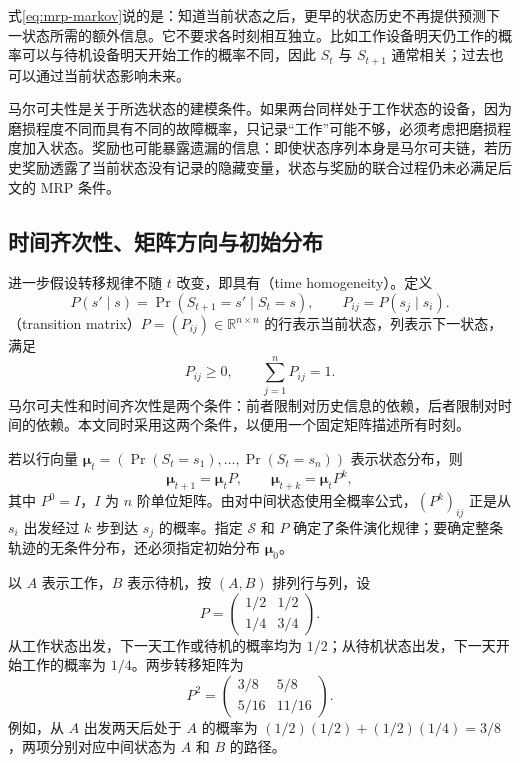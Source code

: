 \documentclass[UTF8]{ctexart}
\begin{document}
式\eqref{eq:mrp-markov}说的是：知道当前状态之后，更早的状态历史不再提供预测下一状态所需的额外信息。它不要求各时刻相互独立。比如工作设备明天仍工作的概率可以与待机设备明天开始工作的概率不同，因此 $S_t$ 与 $S_{t+1}$ 通常相关；过去也可以通过当前状态影响未来。

马尔可夫性是关于所选状态的建模条件。如果两台同样处于工作状态的设备，因为磨损程度不同而具有不同的故障概率，只记录“工作”可能不够，必须考虑把磨损程度加入状态。奖励也可能暴露遗漏的信息：即使状态序列本身是马尔可夫链，若历史奖励透露了当前状态没有记录的隐藏变量，状态与奖励的联合过程仍未必满足后文的 MRP 条件。

\subsection{时间齐次性、矩阵方向与初始分布}

进一步假设转移规律不随 $t$ 改变，即具有（time homogeneity）。定义
\begin{equation}
  P(s'\mid s)=\Pr(S_{t+1}=s'\mid S_t=s),\qquad
  P_{ij}=P(s_j\mid s_i).
  \label{eq:mrp-transition}
\end{equation}
（transition matrix）$P=(P_{ij})\in\mathbb R^{n\times n}$ 的行表示当前状态，列表示下一状态，满足
\[
  P_{ij}\geq0,\qquad \sum_{j=1}^{n}P_{ij}=1.
\]
马尔可夫性和时间齐次性是两个条件：前者限制对历史信息的依赖，后者限制对时间的依赖。本文同时采用这两个条件，以便用一个固定矩阵描述所有时刻。

若以行向量 $\boldsymbol\mu_t=(\Pr(S_t=s_1),\ldots,\Pr(S_t=s_n))$ 表示状态分布，则
\begin{equation}
  \boldsymbol\mu_{t+1}=\boldsymbol\mu_tP,\qquad
  \boldsymbol\mu_{t+k}=\boldsymbol\mu_tP^k,
  \label{eq:mrp-distribution}
\end{equation}
其中 $P^0=I$，$I$ 为 $n$ 阶单位矩阵。由对中间状态使用全概率公式，$(P^k)_{ij}$ 正是从 $s_i$ 出发经过 $k$ 步到达 $s_j$ 的概率。指定 $\mathcal S$ 和 $P$ 确定了条件演化规律；要确定整条轨迹的无条件分布，还必须指定初始分布 $\boldsymbol\mu_0$。

\begin{example}[贯穿全文的两状态模型]
\label{ex:mrp-model}
以 $A$ 表示工作，$B$ 表示待机，按 $(A,B)$ 排列行与列，设
\begin{equation}
  P=\begin{pmatrix}1/2&1/2\\1/4&3/4\end{pmatrix}.
  \label{eq:mrp-example-p}
\end{equation}
从工作状态出发，下一天工作或待机的概率均为 $1/2$；从待机状态出发，下一天开始工作的概率为 $1/4$。两步转移矩阵为
\[
  P^2=\begin{pmatrix}3/8&5/8\\5/16&11/16\end{pmatrix}.
\]
例如，从 $A$ 出发两天后处于 $A$ 的概率为 $(1/2)(1/2)+(1/2)(1/4)=3/8$，两项分别对应中间状态为 $A$ 和 $B$ 的路径。
\end{example}
\end{document}
